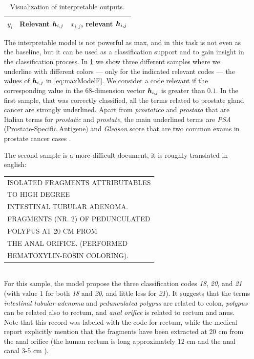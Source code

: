 \begin{table}
  \centering
  \ttfamily
  \scriptsize
  \caption{Visualization of interpretable outputs.}
  \label{tab:multiAttention1}
  \begin{tabular}{|c|c|c|}
    \hline
    $y_i$&\textrm{Relevant} $\bm{h}_{i,j}$&$x_{i,j}$\textrm{, relevant} $\bm{h}_{i,j}$\\
    \hline
    
    \hline
    
    \hline
    
    \hline
  \end{tabular}
\end{table}
The interpretable model is not powerful as \ac{max}, and in this task
is not even as the baseline, but it can be used as a
classification support and to 
gain insight in the classification process. In
\cref{tab:multiAttention1} we show three different samples where we
underline with different colors --- only for the indicated relevant
codes --- the values of $\bm{h}_{i,j}$ in \eqref{eq:maxModelF}. We
consider a code relevant if the corresponding value in the
68-dimension vector $\bm{h}_{i,j}$ is greater than $0.1$. In the
first sample, that was correctly classified, all the terms related to
prostate gland cancer are strongly underlined. Apart from
\emph{prostatico} and \emph{prostata} that are Italian terms for
\emph{prostatic} and \emph{prostate}, the main underlined terms are
\emph{PSA} (Prostate-Specific Antigene) and \emph{Gleason} score that
are two common exams in prostate cancer cases
\cite{brimo2013prostate}.

The second sample is a more difficult
document, it is roughly translated in english:\\
\begin{small}
  \ttfamily
  \begin{tabular}{l}
    ISOLATED FRAGMENTS ATTRIBUTABLES\\
    TO HIGH DEGREE\\
    INTESTINAL TUBULAR ADENOMA.\\
    FRAGMENTS (NR. 2) OF PEDUNCULATED\\
    POLYPUS AT 20 CM FROM\\
    THE ANAL ORIFICE. (PERFORMED\\
    HEMATOXYLIN-EOSIN COLORING).
\end{tabular}
\end{small}\\
For this sample, the model propose the three classification codes \emph{18},
\emph{20}, and \emph{21} (with value $1$ for both \emph{18} and
\emph{20}, and little less for \emph{21}). It suggests that the terms
\emph{intestinal tubular adenoma} and \emph{pedunculated polypus} are
related to colon, \emph{polypus} can be related also to rectum, and
\emph{anal orifice} is related to rectum and anus. Note that this
record was labeled with the code for rectum, while the medical report
explicitly mention that the fragments have been extracted at 20 cm
from the anal orifice (the human rectum is long approximately 12 cm
and the anal canal 3-5 cm \cite{greene2006ajcc}).

